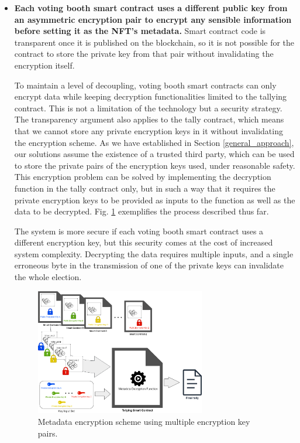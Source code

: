 \documentclass[./4_GeneralApproach.tex]{subfiles}
\begin{document}
\begin{itemize}
    \item{\textbf{Each voting booth smart contract uses a different public key from an asymmetric encryption pair to encrypt any sensible information before setting it as the NFT's metadata.} Smart contract code is transparent once it is published on the blockchain, so it is not possible for the contract to store the private key from that pair without invalidating the encryption itself.
          \par
          To maintain a level of decoupling, voting booth smart contracts can only encrypt data while keeping decryption functionalities limited to the tallying contract. This is not a limitation of the technology but a security strategy. The transparency argument also applies to the tally contract, which means that we cannot store any private encryption keys in it without invalidating the encryption scheme. As we have established in Section \ref{general_approach}, our solutions assume the existence of a trusted third party, which can be used to store the private pairs of the encryption keys used, under reasonable safety. This encryption problem can be solved by implementing the decryption function in the tally contract only, but in such a way that it requires the private encryption keys to be provided as inputs to the function as well as the data to be decrypted. Fig. \ref{fig:multiple_encryption_key_scheme} exemplifies the process described thus far.
          \par
          The system is more secure if each voting booth smart contract uses a different encryption key, but this security comes at the cost of increased system complexity. Decrypting the data requires multiple inputs, and a single erroneous byte in the transmission of one of the private keys can invalidate the whole election.}

          \begin{figure}[htp]
              \centering
              \includegraphics[width=0.7\textwidth]{../Images/ContractBasedSolution_encryption1.png}
              \caption{Metadata encryption scheme using multiple encryption key pairs.}
              \label{fig:multiple_encryption_key_scheme}
          \end{figure}


\end{itemize}
\end{document}
